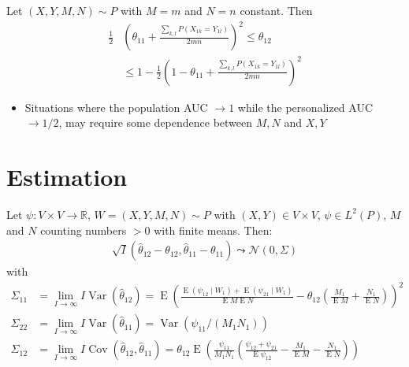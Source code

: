 \documentclass{beamer}
\DeclareMathOperator{\E}{E}
\DeclareMathOperator{\V}{Var}
\DeclareMathOperator{\cov}{Cov}
\newcommand{\I}{I}
\renewcommand{\P}{P}
\newcommand{\cind}{\perp \!\!\! \perp}
\newcommand{\aucindiv}{\theta_{11}}%
\newcommand{\aucpop}{\theta_{12}}%
\newcommand{\aucindivhat}{\hat{\theta}_{11}}%
\newcommand{\aucpophat}{\hat{\theta}_{12}}%
\newcommand{\Kernel}{\psi}
\newcommand{\W}[1]{W_{#1}}
\begin{document}
\begin{frame}
  \begin{theorem}\label{theorem:bounds}
    Let $(X,Y,M,N)\sim \P$ with $M=m$ and $N=n$  constant. Then
    \begin{align}
      \frac{1}{2}&\left(\aucindiv+\frac{\sum_{k,l}\P(X_{1k}=Y_{1l})}{2mn}\right)^2 \le \aucpop \\
      &\le 1-\frac{1}{2}\left(1-\aucindiv+\frac{\sum_{k,l}\P(X_{1k}=Y_{1l})}{2mn}\right)^2      
    \end{align}
  \end{theorem}
  \begin{itemize}
\item Situations where the population AUC $\to 1$ while the personalized AUC $\to 1/2$, may require some dependence between $M,N$ and $X,Y$
\end{itemize}
\end{frame}

\section{Estimation}
\begin{frame}
 Let $\psi:V\times V\to\mathbb{R}$, $W=(X,Y,M,N)\sim\P$ with $(X,Y)\in V\times V$, $\psi\in L^2(\P)$, $M$ and $N$ counting numbers $> 0$ with finite means. Then:
  \begin{align}
    \sqrt{\I}(\aucpophat-\aucpop,\aucindivhat-\aucindiv) \leadsto \mathcal{N}(0,\Sigma)
  \end{align}
  with
  {\small
  \begin{align}
    \Sigma_{11} &= \lim_{\I\to\infty} \I\V(\hat\aucpop) =
    \E\left(\frac{\E(\Kernel_{12}\mid\W{1})+\E(\Kernel_{21}\mid\W{1})}{\E M\E N} - \aucpop\left(\frac{M_1}{\E M} + \frac{N_1}{\E N}\right)   \right)^2
    \\
    \Sigma_{22} &= \lim_{\I\to\infty} \I\V(\hat\aucindiv) =
    \V(\Kernel_{11}/(M_1N_1))
    \\
    \Sigma_{12} &= \lim_{\I\to\infty} \I\cov(\hat\aucpop,\hat\aucindiv) =
    \aucpop\E\left(\frac{\Kernel_{11}}{M_1N_1}\left(\frac{\Kernel_{12}+\Kernel_{21}}{\E\Kernel_{12}} - \frac{M_1}{\E M}-\frac{N_1}{\E N}  \right) \right)
  \end{align}
}  
\end{frame}
\end{document}
